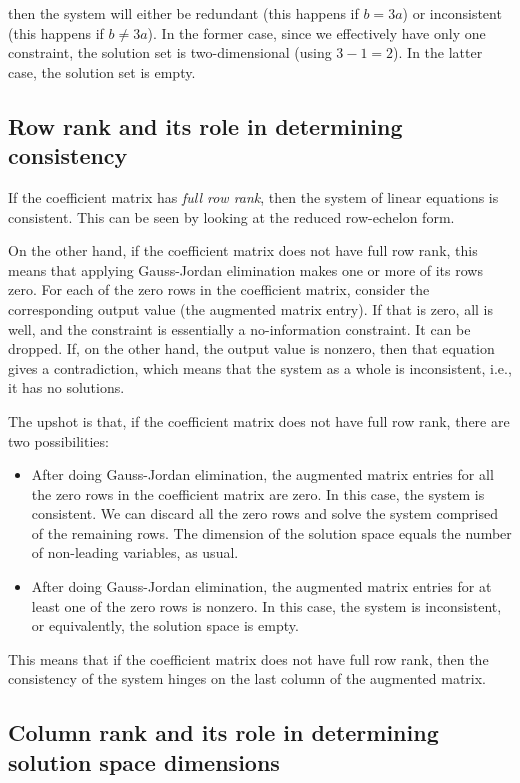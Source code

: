 \documentclass[10pt]{amsart}
\begin{document}
then the system will either be redundant (this happens if $b = 3a$) or
inconsistent (this happens if $b \ne 3a$). In the former case, since
we effectively have only one constraint, the solution set is
two-dimensional (using $3 - 1 = 2$). In the latter case, the solution
set is empty.

\subsection{Row rank and its role in determining consistency}

If the coefficient matrix has {\em full row rank}, then the system of
linear equations is consistent. This can be seen by looking at the
reduced row-echelon form.

On the other hand, if the coefficient matrix does not have full row
rank, this means that applying Gauss-Jordan elimination makes one or
more of its rows zero. For each of the zero rows in the coefficient
matrix, consider the corresponding output value (the augmented matrix
entry). If that is zero, all is well, and the constraint is
essentially a no-information constraint. It can be dropped. If, on the
other hand, the output value is nonzero, then that equation gives a
contradiction, which means that the system as a whole is inconsistent,
i.e., it has no solutions.

The upshot is that, if the coefficient matrix does not have full row
rank, there are two possibilities:

\begin{itemize}
\item After doing Gauss-Jordan elimination, the augmented matrix
  entries for all the zero rows in the coefficient matrix are zero. In
  this case, the system is consistent. We can discard all the zero
  rows and solve the system comprised of the remaining rows. The
  dimension of the solution space equals the number of non-leading
  variables, as usual.
\item After doing Gauss-Jordan elimination, the augmented matrix
  entries for at least one of the zero rows is nonzero. In this case,
  the system is inconsistent, or equivalently, the solution space is
  empty.
\end{itemize}

This means that if the coefficient matrix does not have full row rank,
then the consistency of the system hinges on the last column of the
augmented matrix.

\subsection{Column rank and its role in determining solution space dimensions}
\end{document}

